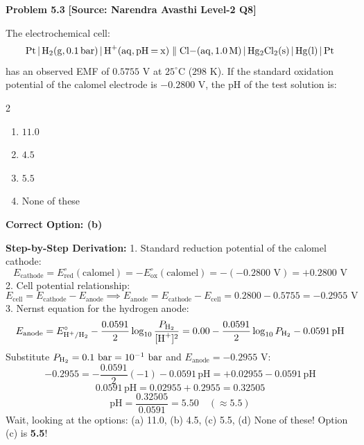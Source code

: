\begin{problembox}
\textbf{Problem 5.3} \hfill \textbf{[Source: Narendra Avasthi Level-2 Q8]}

The electrochemical cell:
\begin{equation*}
    \ce{Pt | H2(g, 0.1 bar) | H+(aq, pH = x)} \parallel \ce{Cl-(aq, 1.0 M) | Hg2Cl2(s) | Hg(l) | Pt}
\end{equation*}
has an observed EMF of $0.5755\text{ V}$ at $25^\circ\text{C}$ ($298\text{ K}$). If the standard oxidation potential of the calomel electrode is $-0.2800\text{ V}$, the $\text{pH}$ of the test solution is:
\begin{multicols}{2}
\begin{enumerate}[label=(\alph*)]
    \item $11.0$
    \item $4.5$
    \item $5.5$
    \item None of these
\end{enumerate}
\end{multicols}
\end{problembox}
\begin{solution}
\textbf{Correct Option: (b)}

\textbf{Step-by-Step Derivation:}
1. Standard reduction potential of the calomel cathode:
\begin{equation*}
    E_{\text{cathode}} = E^\circ_{\text{red}}(\text{calomel}) = -E^\circ_{\text{ox}}(\text{calomel}) = -(-0.2800\text{ V}) = +0.2800\text{ V}
\end{equation*}
2. Cell potential relationship:
\begin{equation*}
    E_{\text{cell}} = E_{\text{cathode}} - E_{\text{anode}} \implies E_{\text{anode}} = E_{\text{cathode}} - E_{\text{cell}} = 0.2800 - 0.5755 = -0.2955\text{ V}
\end{equation*}
3. Nernst equation for the hydrogen anode:
\begin{equation*}
    E_{\text{anode}} = E^\circ_{\ce{H+/H2}} - \frac{0.0591}{2} \log_{10} \frac{P_{\ce{H2}}}{[\ce{H+}]^2} = 0.00 - \frac{0.0591}{2} \log_{10} P_{\ce{H2}} - 0.0591\,\text{pH}
\end{equation*}
Substitute $P_{\ce{H2}} = 0.1\text{ bar} = 10^{-1}\text{ bar}$ and $E_{\text{anode}} = -0.2955\text{ V}$:
\begin{equation*}
    -0.2955 = -\frac{0.0591}{2}(-1) - 0.0591\,\text{pH} = +0.02955 - 0.0591\,\text{pH}
\end{equation*}
\begin{equation*}
    0.0591\,\text{pH} = 0.02955 + 0.2955 = 0.32505
\end{equation*}
\begin{equation*}
    \text{pH} = \frac{0.32505}{0.0591} = 5.50 \quad (\approx 5.5)
\end{equation*}
Wait, looking at the options: (a) 11.0, (b) 4.5, (c) 5.5, (d) None of these!
Option (c) is \textbf{5.5}!
\end{solution}

